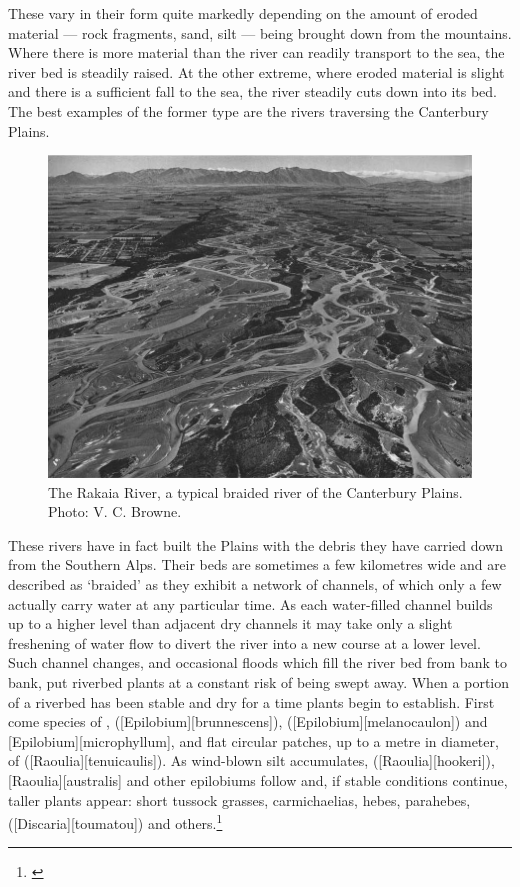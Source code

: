 These vary in their form quite markedly depending on the amount of eroded material --- rock fragments, sand, silt --- being brought down from the mountains.
Where there is more material than the river can readily transport to the sea, the river bed is steadily raised.
At the other extreme, where eroded material is slight and there is a sufficient fall to the sea, the river steadily cuts down into its bed.
The best examples of the former type are the rivers traversing the Canterbury Plains.
\begin{figure}[t]
	\includegraphics[width=\textwidth]{graphics/figure87rakaia.jpg}
	\centering
	\caption[The Rakaia River]{The Rakaia River, a typical braided river of the Canterbury Plains.
	Photo: V. C. Browne.}%
	\label{fig:87rakaia}
\end{figure}
These rivers have in fact built the Plains with the debris they have carried down from the Southern Alps.
Their beds are sometimes a few kilometres wide and are described as `braided' as they exhibit a network of channels, of which only a few actually carry water at any particular time.
As each water-filled channel builds up to a higher level than adjacent dry channels it may take only a slight freshening of water flow to divert the river into a new course at a lower level.
Such channel changes, and occasional floods which fill the river bed from bank to bank, put riverbed plants at a constant risk of being swept away.
When a portion of a riverbed has been stable and dry for a time plants begin to establish.
First come species of ,  ([Epilobium][brunnescens]),  ([Epilobium][melanocaulon]) and [Epilobium][microphyllum], and flat circular patches, up to a metre in diameter, of  ([Raoulia][tenuicaulis]).
As wind-blown silt accumulates,  ([Raoulia][hookeri]), [Raoulia][australis] and other epilobiums follow and, if stable conditions continue, taller plants appear: short tussock grasses, carmichaelias, hebes, parahebes,  ([Discaria][toumatou]) and others.\footnote{\cite{calder1961plant}}

